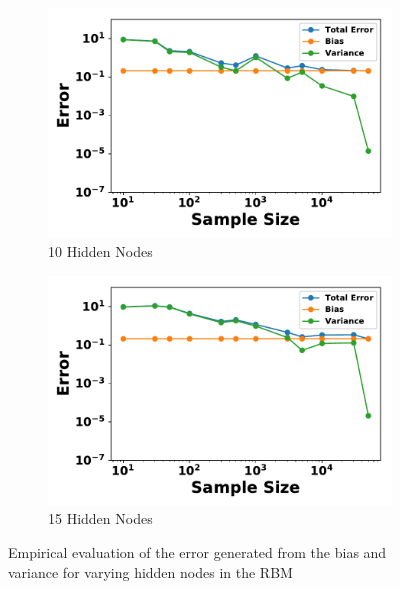 \documentclass[letterpaper]{article} %
\begin{document}
\begin{figure}[p]
\begin{subfigure}[b]{0.245\textwidth}
              \includegraphics[width=\textwidth]{./RBM_Error_vs_Samples_HiddenNodes10-eps-converted-to.pdf}
              \caption{10 Hidden Nodes}
          \end{subfigure}
          \begin{subfigure}[b]{0.245\textwidth}
              \centering
              \includegraphics[width=\textwidth]{./RBM_Error_vs_Samples_HiddenNodes15-eps-converted-to.pdf}
              \caption{15 Hidden Nodes}
          \end{subfigure}
          \caption{Empirical evaluation of the error generated from the bias and variance for varying hidden nodes in the RBM} \label{fig:RBM_sample_size}
        \end{figure}
\end{document}
